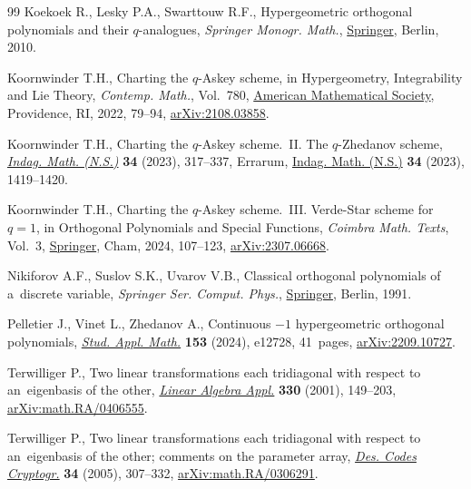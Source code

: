 \documentclass[10pt,a4paper]{amsart}
\numberwithin{equation}{section}
\begin{document}
\begin{thebibliography}{99}
Koekoek R., Lesky P.A., Swarttouw R.F., Hypergeometric orthogonal polynomials
 and their {$q$}-analogues, \textit{Springer Monogr. Math.},
 \href{https://doi.org/10.1007/978-3-642-05014-5}{Springer}, Berlin, 2010.

Koornwinder T.H., Charting the {$q$}-{A}skey scheme, in Hypergeometry,
 Integrability and {L}ie Theory, \textit{Contemp. Math.}, Vol.~780,
 \href{https://doi.org/10.1090/conm/780/15688}{American Mathematical Society},
 Providence, RI, 2022, 79--94,
 \href{http://arxiv.org/abs/2108.03858}{arXiv:2108.03858}.

Koornwinder T.H., Charting the {$q$}-{A}skey scheme.~{II}. {T}he
 {$q$}-{Z}hedanov scheme,
 \href{https://doi.org/10.1016/j.indag.2022.12.003}{\textit{Indag. Math.
 (N.S.)}} \textbf{34} (2023), 317--337, {E}rrarum,
 \href{https://doi.org/10.1016/j.indag.2023.05.006}{Indag. Math. (N.S.)}
 \textbf{34} (2023), 1419--1420.

Koornwinder T.H., Charting the {$q$}-{A}skey scheme.~{III}. Verde-Star scheme
 for $q=1$, in Orthogonal Polynomials and Special Functions, \textit{Coimbra Math. Texts}, Vol.~3, 
 \href{https://doi.org/10.1007/978-3-031-69646-6_5}{Springer}, Cham, 2024, 107--123,
 \href{http://arxiv.org/abs/2307.06668}{arXiv:2307.06668}.

Nikiforov A.F., Suslov S.K., Uvarov V.B., Classical orthogonal polynomials of
 a~discrete variable, \textit{Springer Ser. Comput. Phys.},
 \href{https://doi.org/10.1007/978-3-642-74748-9}{Springer}, Berlin, 1991.

Pelletier J., Vinet L., Zhedanov A., Continuous {$-1$} hypergeometric
 orthogonal polynomials,
 \href{https://doi.org/0.1111/sapm.12728}{\textit{Stud. Appl. Math.}}
 \textbf{153} (2024), e12728, 41~pages,
 \href{http://arxiv.org/abs/2209.10727}{arXiv:2209.10727}.

Terwilliger P., Two linear transformations each tridiagonal with respect to
 an~eigenbasis of the other,
 \href{https://doi.org/10.1016/S0024-3795(01)00242-7}{\textit{Linear Algebra
 Appl.}} \textbf{330} (2001), 149--203,
 \href{http://arxiv.org/abs/math.RA/0406555}{arXiv:math.RA/0406555}.

Terwilliger P., Two linear transformations each tridiagonal with respect to
 an~eigenbasis of the other; comments on the parameter array,
 \href{https://doi.org/10.1007/s10623-004-4862-7}{\textit{Des. Codes
 Cryptogr.}} \textbf{34} (2005), 307--332,
 \href{http://arxiv.org/abs/math.RA/0306291}{arXiv:math.RA/0306291}.


\end{thebibliography}
\end{document}
